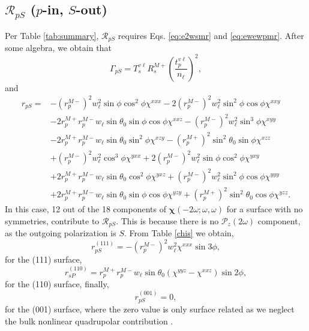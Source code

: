 \subsection{\texorpdfstring{$\mathcal{R}_{pS}$ ($p$-in, $S$-out)}
{RpS (p-in, S-out)}}
\label{sec:RpS}

Per Table \ref{tab:summary}, $\mathcal{R}_{pS}$ requires Eqs. \eqref{eq:e2wsmr}
and \eqref{eq:ewewpmr}. After some algebra, we obtain that
\begin{equation}\label{mcv}
\Gamma_{pS} =
T_{s}^{v\ell}R^{M+}_{s}
\left(\frac{t^{v\ell}_{p}}{n_{\ell}}\right)^{2},
\end{equation}
and
\begin{equation}
\begin{split}
r_{pS}=
&- \left(r^{M-}_{p}\right)^{2}w^{2}_{\ell}\sin\phi\cos^{2}\phi\chi^{xxx}
 - 2\left(r^{M-}_{p}\right)^{2}w^{2}_{\ell}\sin^{2}\phi\cos\phi\chi^{xxy}\\
&- 2r^{M+}_{p}r^{M-}_{p}w_{\ell}\sin\theta_{0}\sin\phi\cos\phi\chi^{xxz}
 - \left(r^{M-}_{p}\right)^{2}w^{2}_{\ell}\sin^{3}\phi\chi^{xyy}\\
&- 2r^{M+}_{p}r^{M-}_{p}w_{\ell}\sin\theta_{0}\sin^{2}\phi\chi^{xzy}
 - \left(r^{M+}_{p}\right)^{2}\sin^{2}\theta_{0}\sin\phi\chi^{xzz}\\
&+ \left(r^{M-}_{p}\right)^{2}w^{2}_{\ell}\cos^{3}\phi\chi^{yxx}
 + 2\left(r^{M-}_{p}\right)^{2}w^{2}_{\ell}\sin\phi\cos^{2}\phi\chi^{yxy}\\
&+ 2r^{M+}_{p}r^{M-}_{p}w_{\ell}\sin\theta_{0}\cos^{2}\phi\chi^{yxz}
 + \left(r^{M-}_{p}\right)^{2}w^{2}_{\ell}\sin^{2}\phi\cos\phi\chi^{yyy}\\
&+ 2r^{M+}_{p}r^{M-}_{p}w_{\ell}\sin\theta_{0}\sin\phi\cos\phi\chi^{yzy}
 + \left(r^{M+}_{p}\right)^{2}\sin^{2}\theta_{0}\cos\phi\chi^{yzz}.
\end{split}
\end{equation}
In this case, 12 out of the 18 components of
$\boldsymbol{\chi}(-2\omega;\omega,\omega)$ for a surface with no symmetries,
contribute to $\mathcal{R}_{pS}$. This is because there is no
$\mathcal{P}_{z}(2\omega)$ component, as the outgoing polarization is $S$. From
Table \ref{chis} we obtain,
\begin{equation}\label{eq:rps111}
r^{(111)}_{pS} = - \left(r^{M-}_{p}\right)^{2}w^{2}_{\ell}\chi^{xxx}\sin3\phi,
\end{equation}
for the (111) surface,
\begin{equation}\label{eq:rps110}
r^{(110)}_{sP} =
r^{M+}_{p}r^{M-}_{p}w_{\ell}\sin\theta_{0}(\chi^{yyz} - \chi^{xxz})\sin2\phi,
\end{equation}
for the (110) surface, 
finally,
\begin{equation}\label{eq:rps001}
r^{(001)}_{pS} = 0,
\end{equation}
for the (001) surface, where the zero value is only surface related as we
neglect the bulk nonlinear quadrupolar contribution \cite{sipePRB87}.


